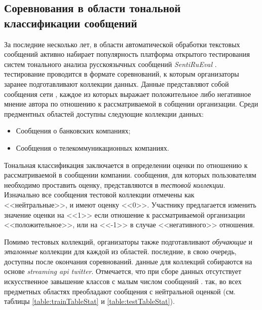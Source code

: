 \subsection{Соревнования в области тональной классификации сообщений}
    \label{sec:tonalityCompetition}
    За последние несколько лет, в области автоматической обработки текстовых сообщений
    активно набирает популярность платформа открытого тестирования систем
    тонального анализа русскоязычных сообщений {\it SentiRuEval} \cite{tonalityanalisys}.
    тестирование проводится в формате соревнований, к которым организаторы заранее подготавливают
    коллекции данных. Данные представляют собой сообщения сети \twitter, каждое из которых
    выражает положительное либо негативное мнение автора по отношению к рассматриваемой
    в собщении организации. Среди предментных областей доступны следующие коллекции
    данных:
    \begin{itemize}
        \item Сообщения о банковских компаниях;
        \item Сообщения о телекоммуникационных компаниях.
    \end{itemize}

    Тональная классификация заключается в определении оценки по отношению к
    рассматриваемой в сообщении компании. сообщения, для которых пользователям
    необходимо проставить оценку, представляются в {\it тестовой коллекции}. Изначально все
    сообщения тестовой коллекции отмечены как <<нейтральные>>, и имеют оценку <<0>>.
    Участнику предлагается изменить значение оценки на <<1>> если отношение к
    рассматриваемой организации <<положительное>>, или на <<-1>> в случае
    <<негативного>> отношения.


    Помимо тестовых коллекций, организаторы также подготавливают {\it обучающие} и
    {\it эталонные} коллекции для каждой из областей. последние, в свою очередь,
    доступны после окончания соревнований. данные для коллекций собираются на
    основе {\it streaming api twitter}. Отмечается, что при сборе данных отсутствует
    искусственное завышение классов с малым числом сообщений \cite{tonalityanalisys}.
    так, во всех предметных областях преобладают сообщения с нейтральной оценкой (см. таблицы
    \ref{table:trainTableStat} и \ref{table:testTableStat}).

